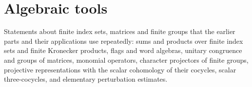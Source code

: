 \part{Algebraic tools}
\label{part:algebraic_tools}

Statements about finite index sets, matrices and finite groups that the
earlier parts and their applications use repeatedly: sums and products over
finite index sets and finite Kronecker products, flags and word algebras,
unitary congruence and groups of matrices, monomial operators, character
projectors of finite groups, projective representations with the scalar
cohomology of their cocycles, scalar three-cocycles, and elementary
perturbation estimates.

